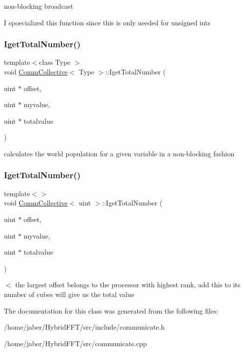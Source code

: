non-\/blocking broadcast

I spoecialized this function since this is only needed for unsigned ints \mbox{\label{classCommCollective_a0b8611d0fce41f5b6629ebf702e7aa4b}} 
\subsubsection{\texorpdfstring{Iget\+Total\+Number()}{IgetTotalNumber()}\hspace{0.1cm}{\footnotesize\ttfamily [1/2]}}
{\footnotesize\ttfamily template$<$class Type $>$ \\
void \mbox{\hyperlink{classCommCollective}{Comm\+Collective}}$<$ Type $>$\+::Iget\+Total\+Number (\begin{DoxyParamCaption}\item[{uint $\ast$}]{offset,  }\item[{uint $\ast$}]{myvalue,  }\item[{uint $\ast$}]{totalvalue }\end{DoxyParamCaption})}

calculates the world population for a given variable in a non-\/blocking fashion \mbox{\label{classCommCollective_a2603f0331222a5f76a29a0bf3a187ae4}} 
\subsubsection{\texorpdfstring{Iget\+Total\+Number()}{IgetTotalNumber()}\hspace{0.1cm}{\footnotesize\ttfamily [2/2]}}
{\footnotesize\ttfamily template$<$$>$ \\
void \mbox{\hyperlink{classCommCollective}{Comm\+Collective}}$<$ uint $>$\+::Iget\+Total\+Number (\begin{DoxyParamCaption}\item[{uint $\ast$}]{offset,  }\item[{uint $\ast$}]{myvalue,  }\item[{uint $\ast$}]{totalvalue }\end{DoxyParamCaption})}

$<$ the largest offset belongs to the processor with highest rank, add this to its number of cubes will give us the total value 

The documentation for this class was generated from the following files\+:\begin{DoxyCompactItemize}
\item 
/home/jaber/\+Hybrid\+F\+F\+T/src/include/communicate.\+h\item 
/home/jaber/\+Hybrid\+F\+F\+T/src/communicate.\+cpp\end{DoxyCompactItemize}
